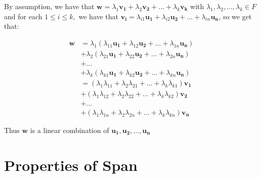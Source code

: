\documentclass{report}
\begin{document}
\begin{myproof}
    
By assumption, we have that 
$\mathbf{w}=\lambda _1\mathbf{v_1} + \lambda _2\mathbf{v_2} + ... + \lambda _k\mathbf{v_k}$ with $\lambda _1, \lambda _2, ..., \lambda _k \in F$ and for each $1\le i\le k,$  we have that $\mathbf{v_i} = \lambda _{i1}\mathbf{u_1} + \lambda _{i2}\mathbf{u_2} + ... + \lambda _{in}\mathbf{u_n}$, so we get that:

$$
\begin{aligned}
    \mathbf{w} & = \lambda _1 (\lambda _{11}\mathbf{u_1} + \lambda _{12}\mathbf{u_2} + ... + \lambda _{1n}\mathbf{u_n}) \\
& +  \lambda _2(\lambda _{21}\mathbf{u_1} + \lambda _{22}\mathbf{u_2} + ... +  \lambda _{2n}\mathbf{u_n}) \\
& + \ldots \\
& +  \lambda _k (\lambda _{k1}\mathbf{u_1} + \lambda _{k2}\mathbf{u_2} + ... + \lambda _{kn}\mathbf{u_n}) \\ 
& = (\lambda _1 \lambda _{11} + \lambda _2 \lambda _{21} + ... + \lambda _k \lambda _{k1}) \mathbf{v_1} \\
& + (\lambda _1 \lambda _{12} + \lambda _2 \lambda _{22} + ... + \lambda _k \lambda _{k2}) \mathbf{v_2}  \\
& +  ... \\
& + (\lambda _1 \lambda _{1n} + \lambda _2 \lambda _{2n} + ... + \lambda _k \lambda _{kn}) \mathbf{v_n} 
\end{aligned}
$$

Thus $\mathbf{w}$ is a linear combination of $\mathbf{u_1},\mathbf{u_2},...,\mathbf{u_n}$
\end{myproof}


\section{Properties of Span}


\end{document}

